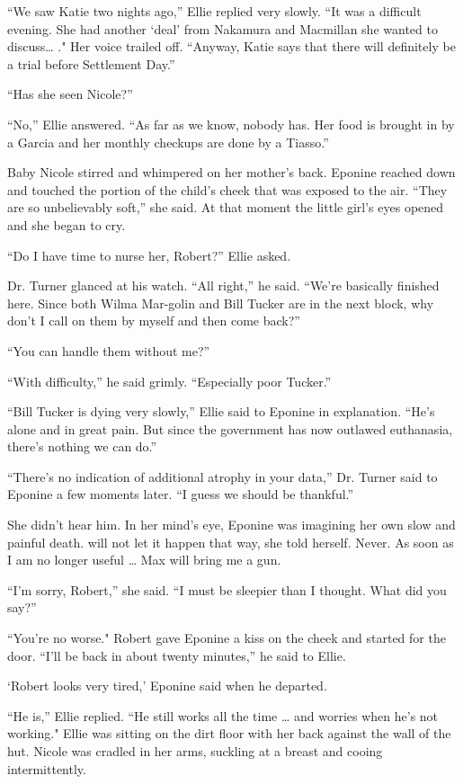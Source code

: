 \documentclass[]{article}
\begin{document}
{{“We saw Katie two nights ago,” Ellie replied very slowly.  “It was a difficult evening.  She had another ‘deal’ from Nakamura and Macmillan she wanted to discuss… ."  Her voice trailed off.  “Anyway, Katie says that there will definitely be a trial before Settlement Day.”

“Has she seen Nicole?”

“No,” Ellie answered.  “As far as we know, nobody has.  Her food is brought in by a Garcia and her monthly checkups are done by a Tiasso.”

Baby Nicole stirred and whimpered on her mother’s back.  Eponine reached down and touched the portion of the child’s cheek that was exposed to the air.  “They are so unbelievably soft,” she said.  At that moment the little girl’s eyes opened and she began to cry.

“Do I have time to nurse her, Robert?” Ellie asked.

Dr.  Turner glanced at his watch.  “All right,” he said.  “We’re basically finished here.  Since both Wilma Mar-golin and Bill Tucker are in the next block, why don’t I call on them by myself and then come back?”

“You can handle them without me?”

“With difficulty,” he said grimly.  “Especially poor Tucker.”

“Bill Tucker is dying very slowly,” Ellie said to Eponine in explanation.  “He’s alone and in great pain.  But since the government has now outlawed euthanasia, there’s nothing we can do.”

“There’s no indication of additional atrophy in your data,” Dr.  Turner said to Eponine a few moments later.  “I guess we should be thankful.”

She didn’t hear him.  In her mind’s eye, Eponine was imagining her own slow and painful death.  will not let it happen that way, she told herself.  Never.  As soon as I am no longer useful … Max will bring me a gun.

“I’m sorry, Robert,” she said.  “I must be sleepier than I thought.  What did you say?”

“You’re no worse."  Robert gave Eponine a kiss on the cheek and started for the door.  “I’ll be back in about twenty minutes,” he said to Ellie.

‘Robert looks very tired,’ Eponine said when he departed.

“He is,” Ellie replied.  “He still works all the time … and worries when he’s not working."  Ellie was sitting on the dirt floor with her back against the wall of the hut.  Nicole was cradled in her arms, suckling at a breast and cooing intermittently.

}}
\end{document}
